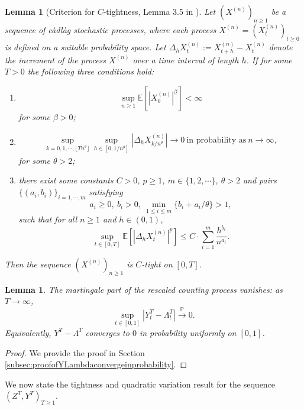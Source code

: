 \documentclass[letterpaper]{article}
\numberwithin{equation}{section}
\newtheorem{lemma}[theorem]{Lemma}
\theoremstyle{definition}
\theoremstyle{remark}
\begin{document}
\begin{lemma}[Criterion for $C$-tightness, Lemma 3.5 in \cite{horst2023convergence}]\label{xu2023}
  Let $(X^{(n)})_{n\ge1}$ be a sequence of càdlàg stochastic processes, where each process $X^{(n)} = (X_t^{(n)})_{t \ge 0}$ is defined on a suitable probability space. Let $\Delta_h X_t^{(n)} := X_{t+h}^{(n)} - X_t^{(n)}$ denote the increment of the process $X^{(n)}$ over a time interval of length $h$. If for some $T>0$ the following three conditions hold:
  \begin{enumerate}
    \item 
    \[
      \sup_{n\ge1}\mathbb E\left[ \left|X^{(n)}_0\right|^\beta \right]<\infty
    \]
    for some $\beta>0$;
    \item \begin{align*}
      \sup_{k=0,1,\cdots,\lfloor Tn^\theta\rfloor}\sup_{h\in[0,1/n^\theta]}|\Delta_hX_{k/n^\theta}^{(n)}|\rightarrow 0\ \text{in probability as}\ n\rightarrow\infty,
    \end{align*}
    for some $\theta>2$;
    \item there exist some constants $C>0$, $p\ge1$, $m\in\{1,2,\cdots\}$, $\theta>2$ and pairs $\{(a_i,b_i)\}_{i=1,\cdots,m}$ satisfying
        \[
          a_i\ge0,\ b_i>0,\ \min_{1\le i\le m}\{b_i+a_i/\theta\}>1,
        \]
        such that for all $n\ge1$ and $h\in(0,1)$,
        \[
          \sup_{t\in[0,T]}\mathbb E\left[ \left|\Delta_hX_t^{(n)}\right|^p \right]\le C\cdot\sum_{i=1}^m\frac{h^{b_i}}{n^{a_i}}.
        \]
  \end{enumerate}
  Then the sequence $(X^{(n)})_{n\ge1}$ is $C$-tight on $[0, T]$.
\end{lemma}

\begin{lemma}\label{lemma:YLambdaconvergeinprobability}
  {
  The martingale part of the rescaled counting process vanishes: as $T\to\infty$,
  }
  \[
    {
    \sup_{t\in[0,1]}\left|Y_t^T-\Lambda_t^T\right|\xrightarrow{\mathbb P}0.}
  \]
  {
  Equivalently, $Y^T-\Lambda^T$ converges to $0$ in probability uniformly on $[0,1]$.
  }
\end{lemma}

\begin{proof}
  We provide the proof in Section \ref{subsec:proofofYLambdaconvergeinprobability}.
\end{proof}

We now state the tightness and quadratic variation result for the sequence $(Z^T,Y^T)_{T\ge 1}$.
\end{document}
